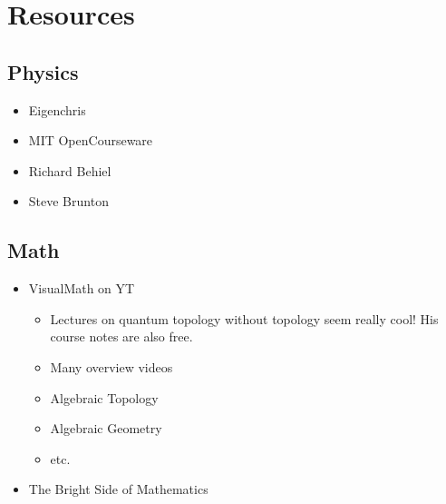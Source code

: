 \section*{Resources}
\subsection*{Physics}
\begin{itemize}
    \item Eigenchris
    \item MIT OpenCourseware
    \item Richard Behiel
    \item Steve Brunton
\end{itemize}
\subsection*{Math}
\begin{itemize}
    \item VisualMath on YT \begin{itemize}
        \item Lectures on quantum topology without topology seem really cool! His course notes are also free.
        \item Many overview videos
        \item Algebraic Topology
        \item Algebraic Geometry
        \item etc.
    \end{itemize}
    \item The Bright Side of Mathematics
\end{itemize}